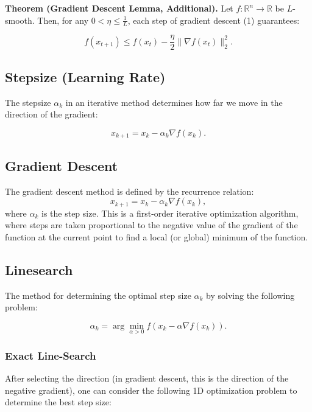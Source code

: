 \documentclass[a4paper,12pt]{article}
\begin{document}
\textbf{Theorem (Gradient Descent Lemma, Additional).}  
Let \( f: \mathbb{R}^n \to \mathbb{R} \) be \( L \)-smooth.  
Then, for any \( 0 < \eta \leq \frac{1}{L} \), each step of gradient descent (1) guarantees:

\[
f(x_{t+1}) \leq f(x_t) - \frac{\eta}{2} \|\nabla f(x_t)\|_2^2.
\]


\subsection{Stepsize (Learning Rate)}  
The stepsize \( \alpha_k \) in an iterative method determines how far we move in the direction of the gradient:

\begin{equation}
    x_{k+1} = x_k - \alpha_k \nabla f(x_k).
\end{equation}

\subsection{Gradient Descent}  
The gradient descent method is defined by the recurrence relation:
\begin{equation}
    x_{k+1} = x_k - \alpha_k \nabla f(x_k),
\end{equation}
where \( \alpha_k \) is the step size. This is a first-order iterative optimization algorithm, where steps are taken proportional to the negative value of the gradient of the function at the current point to find a local (or global) minimum of the function.

\subsection{Linesearch}  
The method for determining the optimal step size \( \alpha_k \) by solving the following problem:

\begin{equation}
    \alpha_k = \arg\min_{\alpha > 0} f(x_k - \alpha \nabla f(x_k)).
\end{equation}

\subsubsection{Exact Line-Search}  
After selecting the direction (in gradient descent, this is the direction of the negative gradient), one can consider the following 1D optimization problem to determine the best step size:
\end{document}
